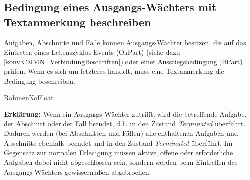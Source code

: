 \documentclass[12pt,report]{snetTeaching}
\begin{document}
\begin{RahmenNoFloat}
	\hfill
\end{RahmenNoFloat}


\subsection{Bedingung eines Ausgangs-Wächters mit Textanmerkung beschreiben}

Aufgaben, Abschnitte und Fälle können Ausgangs-Wächter besitzen, die auf das Eintreten eines Lebenszyklus-Events (OnPart) (siehe dazu \ref{konv:CMMN_VerbindungBeschriften}) oder einer Ausstiegsbedingung (IfPart) prüfen. Wenn es sich um letzteres handelt, muss eine Textanmerkung die Bedingung beschreiben.

RahmenNoFloat
\begin{RahmenNoFloat}
	\hfill
\end{RahmenNoFloat}

\textbf{Erklärung:} Wenn ein Ausgangs-Wächter zutrifft, wird die betreffende Aufgabe, der Abschnitt oder der Fall beendet, d.h. in den Zustand \emph{Terminated} überführt. Dadurch werden (bei Abschnitten und Fällen) alle enthaltenen Aufgaben und Abschnitte ebenfalls beendet und in den Zustand \emph{Terminated} überführt. Im Gegensatz zur normalen Erledigung müssen aktive, offene oder erforderliche Aufgaben dabei nicht abgeschlossen sein, sondern werden beim Eintreffen des Ausgangs-Wächters gewissermaßen abgebrochen.
\end{document}
